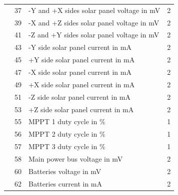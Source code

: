\begin{longtable}[c]{lcL{0.4\textwidth}c}
	                                     & 37                & -Y and +X sides solar panel voltage in mV            & 2                       \\
	                                     & 39                & -X and +Z sides solar panel voltage in mV            & 2                       \\
	                                     & 41                & -Z and +Y sides solar panel voltage in mV            & 2                       \\
	                                     & 43                & -Y side solar panel current in mA                    & 2                       \\
	                                     & 45                & +Y side solar panel current in mA                    & 2                       \\
	                                     & 47                & -X side solar panel current in mA                    & 2                       \\
	                                     & 49                & +X side solar panel current in mA                    & 2                       \\
	                                     & 51                & -Z side solar panel current in mA                    & 2                       \\
	                                     & 53                & +Z side solar panel current in mA                    & 2                       \\
	                                     & 55                & MPPT 1 duty cycle in \%                              & 1                       \\
	                                     & 56                & MPPT 2 duty cycle in \%                              & 1                       \\
	                                     & 57                & MPPT 3 duty cycle in \%                              & 1                       \\
	                                     & 58                & Main power bus voltage in mV                         & 2                       \\
	                                     & 60                & Batteries voltage in mV                              & 2                       \\
	                                     & 62                & Batteries current in mA                              & 2                       \\

\end{longtable}
